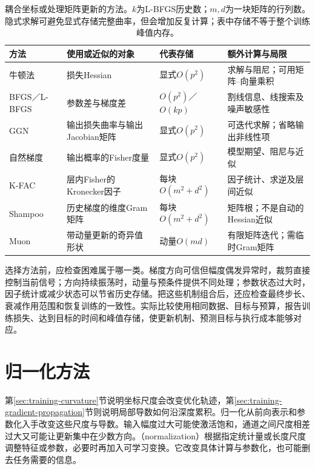\begin{table}[htbp]
  \centering\small
  \begin{tabularx}{\linewidth}{@{}p{27mm}p{43mm}p{31mm}X@{}}
    \toprule
    方法 & 使用或近似的对象 & 代表存储 & 额外计算与局限 \\
    \midrule
    牛顿法 & 损失Hessian & 显式$O(p^2)$ & 求解与阻尼；可用矩阵--向量乘积 \\
    BFGS／L-BFGS & 参数差与梯度差 & $O(p^2)$／$O(kp)$ & 割线信息、线搜索及噪声敏感性 \\
    GGN & 输出损失曲率与输出Jacobian矩阵 & 显式$O(p^2)$ & 可迭代求解；省略输出非线性项 \\
    自然梯度 & 输出概率的Fisher度量 & 显式$O(p^2)$ & 模型期望、阻尼与近似 \\
    K-FAC & 层内Fisher的Kronecker因子 & 每块$O(m^2+d^2)$ & 因子统计、求逆及层间近似 \\
    Shampoo & 历史梯度的维度Gram矩阵 & 每块$O(m^2+d^2)$ & 矩阵根；不是自动的Hessian近似 \\
    Muon & 带动量更新的奇异值形状 & 动量$O(md)$ & 有限矩阵迭代；需临时Gram矩阵 \\
    \bottomrule
  \end{tabularx}
  \caption{耦合坐标或处理矩阵更新的方法。$k$为L-BFGS历史数；$m,d$为一块矩阵的行列数。隐式求解可避免显式存储完整曲率，但会增加反复计算；表中存储不等于整个训练峰值内存。}
  \label{tab:training-matrix-comparison}
\end{table}
\FloatBarrier

选择方法前，应检查困难属于哪一类。梯度方向可信但幅度偶发异常时，裁剪直接控制当前信号；方向持续振荡时，动量与预条件提供不同处理；参数状态过大时，因子统计或减少状态可以节省历史存储。把这些机制组合后，还应检查最终步长、衰减作用范围和恢复训练的一致性。实际比较使用相同数据、目标与预算，报告训练损失、达到目标的时间和峰值存储，使更新机制、预测目标与执行成本能够对应。

\section{归一化方法}
\label{sec:training-normalization}
第\ref{sec:training-curvature}节说明坐标尺度会改变优化轨迹，第\ref{sec:training-gradient-propagation}节则说明局部导数如何沿深度累积。归一化从前向表示和参数化入手改变这些尺度与导数。输入幅度过大可能使激活饱和，通道之间尺度相差过大又可能让更新集中在少数方向。（normalization）根据指定统计量或长度尺度调整特征或参数，必要时再加入可学习变换。它改变具体计算与参数化，也可能删去任务需要的信息。


